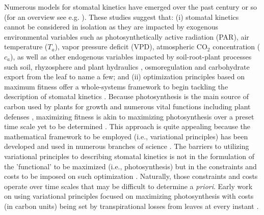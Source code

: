 \documentclass[utf8]{frontiersSCNS} %
\begin{document}
Numerous models for stomatal kinetics have emerged over the past century or so (for an overview see e.g. \citet{jarvis1976interpretation,collatz_physiological_1991,leuning_critical_1995,damour2010overview,way2011well} ). These studies suggest that:  (i) stomatal kinetics cannot be considered in isolation as they are impacted by exogenous environmental variables \citep{jarvis1976interpretation,pearcy1990sunflecks,mott1991stomatal,medlyn_temperature_2002} such as photosynthetically active radiation (PAR), air temperature ($T_a$), vapor pressure deficit (VPD), atmospheric CO$_2$ concentration ($c_a$), as well as other endogenous variables impacted by soil-root-plant processes such soil, rhyzosphere and plant hydraulics \citep{sperry_hydraulic_2000, brodribb_relations_2003}, osmoregulation and carbohydrate export from the leaf \citep{nikinmaa_assimilate_2013,sevanto_how_2014,jensen2016sap,konrad2018xylem} to name a few; and  (ii) optimization principles based on maximum fitness offer a whole-systems framework to begin tackling the description of stomatal kinetics \citep{manzoni_optimizing_2011,manzoni_optimization_2013,huang2018transport}. Because photosynthesis is the main source of carbon used by plants for growth and numerous vital functions including plant defenses \citep{novick2012increased}, maximizing fitness is akin to maximizing photosynthesis over a preset time scale yet to be determined \citep{cowan1971relative,givnish1976sizes,cowan_stomatal_1977,dewar2010maximum}.  This approach is quite appealing because the mathematical framework to be employed (i.e., variational principles) has been developed and used in numerous branches of science \citep{witelski_variational_2015}.  The barriers to utilizing variational principles to describing stomatal kinetics is not in the formulation of the 'functional' to be maximized (i.e., photosynthesis) but in the constraints and costs to be imposed on such optimization \citep{dewar2018new}.  Naturally, those constraints and costs operate over time scales that may be difficult to determine a \textit{priori}.  Early work on using variational principles focused on maximizing photosynthesis with costs (in carbon units) being set by transpirational losses from leaves at every instant \citep{cowan_stomatal_1977,cowan_stomatal_1978}. 
\end{document}

